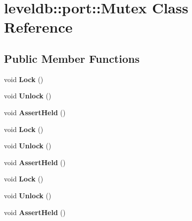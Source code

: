 \hypertarget{classleveldb_1_1port_1_1_mutex}{}\section{leveldb\+::port\+::Mutex Class Reference}
\label{classleveldb_1_1port_1_1_mutex}
\subsection*{Public Member Functions}
\begin{DoxyCompactItemize}
\item 
\mbox{\label{classleveldb_1_1port_1_1_mutex_a9a4da7195ce1802c077bc4d0035d4dd1}} 
void {\bfseries Lock} ()
\item 
\mbox{\label{classleveldb_1_1port_1_1_mutex_a9d69a21c53dad7732b2006acf87f006b}} 
void {\bfseries Unlock} ()
\item 
\mbox{\label{classleveldb_1_1port_1_1_mutex_a9793393529f59bbb4adaf152bbbab42c}} 
void {\bfseries Assert\+Held} ()
\item 
\mbox{\label{classleveldb_1_1port_1_1_mutex_a9a4da7195ce1802c077bc4d0035d4dd1}} 
void {\bfseries Lock} ()
\item 
\mbox{\label{classleveldb_1_1port_1_1_mutex_a9d69a21c53dad7732b2006acf87f006b}} 
void {\bfseries Unlock} ()
\item 
\mbox{\label{classleveldb_1_1port_1_1_mutex_a9793393529f59bbb4adaf152bbbab42c}} 
void {\bfseries Assert\+Held} ()
\item 
\mbox{\label{classleveldb_1_1port_1_1_mutex_a9a4da7195ce1802c077bc4d0035d4dd1}} 
void {\bfseries Lock} ()
\item 
\mbox{\label{classleveldb_1_1port_1_1_mutex_a9d69a21c53dad7732b2006acf87f006b}} 
void {\bfseries Unlock} ()
\item 
\mbox{\label{classleveldb_1_1port_1_1_mutex_a9793393529f59bbb4adaf152bbbab42c}} 
void {\bfseries Assert\+Held} ()
\end{DoxyCompactItemize}
